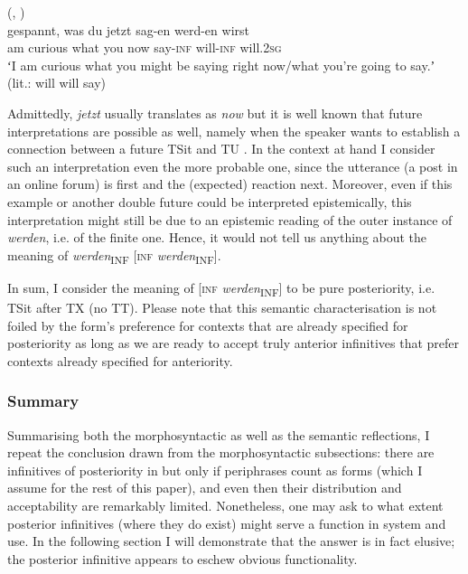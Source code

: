 \documentclass[output=paper,hidelinks]{langscibook}
\begin{document}
\ea\label{ex:reiner:36} 	 (, \citealt[115]{Rothstein2013a}) \\
	{gespannt,}	{was}	{du}	{jetzt}  {sag-en}		{werd-en}	{wirst}\\
am	curious	what	you	now say-\textsc{inf}		will-\textsc{inf}	will.\textsc{2sg}\\
\glt ʻI am curious what you might be saying right now/what you’re going to say.ʼ (lit.: will will say)
\z

Admittedly, \emph{jetzt} usually translates as \emph{now} but it is well known that future interpretations are possible as well, namely when the speaker wants to establish a connection between a future TSit and TU \citep[34–35]{Imo2010}. In the context at hand I consider such an interpretation even the more probable one, since the utterance (a post in an online forum) is first and the (expected) reaction next. Moreover, even if this example or another double future could be interpreted epistemically, this interpretation might still be due to an epistemic reading of the outer instance of \emph{werden}, i.e. of the finite one. Hence, it would not tell us anything about the meaning of \textit{werden}\textsubscript{INF} [\textsc{inf} \textit{werden}\textsubscript{INF}].

In sum, I consider the meaning of [\textsc{inf} \textit{werden}\textsubscript{INF}] to be pure posteriority, i.e. TSit after TX (no TT). Please note that this semantic characterisation is not foiled by the form’s preference for contexts that are already specified for posteriority as long as we are ready to accept truly anterior infinitives that prefer contexts already specified for anteriority.

\subsubsection{Summary}
Summarising both the morphosyntactic as well as the semantic reflections, I repeat the conclusion drawn from the morphosyntactic subsections: there are infinitives of posteriority in  but only if periphrases count as forms (which I assume for the rest of this paper), and even then their distribution and acceptability are remarkably limited. Nonetheless, one may ask to what extent posterior infinitives (where they do exist) might serve a function in system and use. In the following section I will demonstrate that the answer is in fact elusive; the posterior infinitive appears to eschew obvious functionality.
\end{document}
